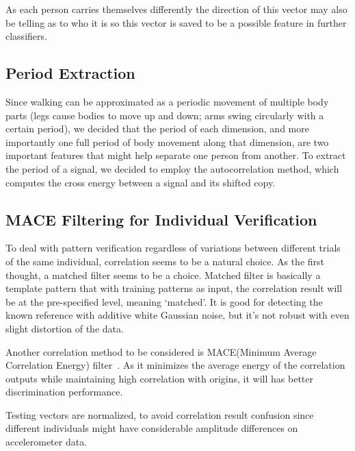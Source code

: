 \documentclass[10pt,twocolumn,letterpaper]{article}
\begin{document}
\begin{figure}[t]
\begin{center}
\fbox{\rule{0pt}{2in} \rule{0.9\linewidth}{0pt}}
   \caption{}
\end{center}
\end{figure}

As each person carries themselves differently the direction of this vector may also be telling as to who it is so this vector is saved to be a possible feature in further classifiers.

\subsection{Period Extraction}
Since walking can be approximated as a periodic movement of multiple body parts (legs cause bodies to move up and down; arms swing circularly with a certain period), we decided that the period of each dimension, and more importantly one full period of body movement along that dimension, are two important features that might help separate one person from another. To extract the period of a signal, we decided to employ the autocorrelation method, which computes the cross energy between a signal and its shifted copy.  

\subsection{MACE Filtering for Individual Verification}
To deal with pattern verification regardless of variations between different trials of the same individual, correlation seems to be a natural choice. As the first thought, a matched filter seems to be a choice. Matched filter is basically a template pattern that with training patterns as input, the correlation result will be at the pre-specified level, meaning ‘matched’. It is good for detecting the known reference with additive white Gaussian noise, but it’s not robust with even slight distortion of the data. 

Another correlation method to be considered is MACE(Minimum Average Correlation Energy) filter~\cite{Author01}. As it minimizes the average energy of the correlation outputs while maintaining high correlation with origins, it will has better discrimination performance. 

Testing vectors are normalized, to avoid correlation result confusion since different individuals might have considerable amplitude differences on accelerometer data.
\end{document}
